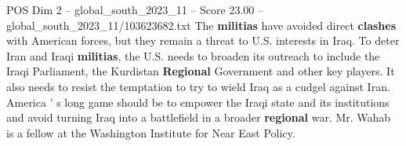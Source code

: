 \begin{textsample}{POS Dim 2 – global\_south\_2023\_11 – Score 23.00 – global\_south\_2023\_11/103623682.txt}
The \textbf{militias} have avoided direct \textbf{clashes} with American forces, but they remain a threat to U.S. interests in Iraq.
To deter Iran and Iraqi \textbf{militias}, the U.S. needs to broaden its outreach to include the Iraqi Parliament, the Kurdistan \textbf{Regional} Government and other key players.
It also needs to resist the temptation to try to wield Iraq as a cudgel against Iran.
America ' s long game should be to empower the Iraqi state and its institutions and avoid turning Iraq into a battlefield in a broader \textbf{regional} war.
Mr.
Wahab is a fellow at the Washington Institute for Near East Policy.

\end{textsample}
